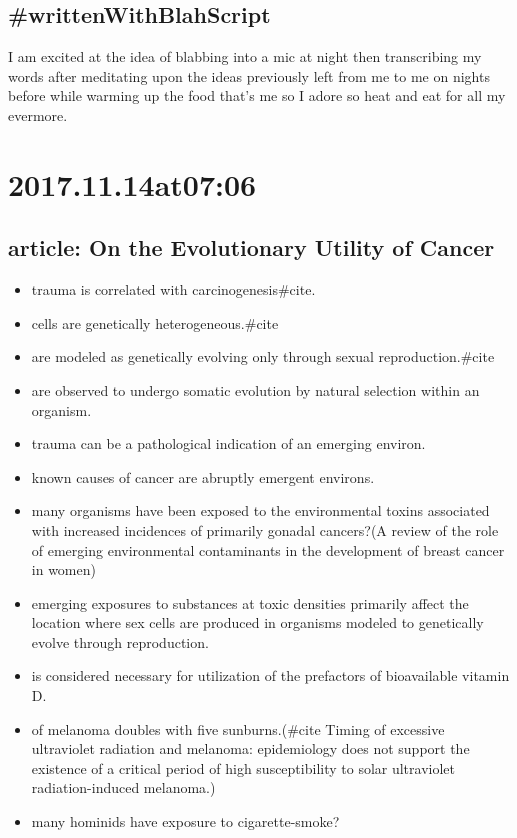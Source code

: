 \begin{enumerate}
\begin{enumerate}
\subsection*{ #writtenWithBlahScript }
I am excited at the idea of blabbing into a mic at night then transcribing my words after meditating upon the ideas previously left from me to me on nights before while warming up the food that's me so I adore so heat and eat for all my evermore.

\section*{ 2017.11.14at07:06 }
\subsection*{ article: On the Evolutionary Utility of Cancer }
\begin{itemize}
  \item trauma is correlated with carcinogenesis#cite.
  \item cells are genetically heterogeneous.#cite
  \item are modeled as genetically evolving only through sexual reproduction.#cite
  \item are observed to undergo somatic evolution by natural selection within an organism.
  \item trauma can be a pathological indication of an emerging environ.
  \item known causes of cancer are abruptly emergent environs.
  \item many organisms have been exposed to the environmental toxins associated with increased incidences of primarily gonadal cancers?(A review of the role of emerging environmental contaminants in the development of breast cancer in women)
  \item emerging exposures to substances at toxic densities primarily affect the location where sex cells are produced in organisms modeled to genetically evolve through reproduction.
  \item is considered necessary for utilization of the prefactors of bioavailable vitamin D.
  \item of melanoma doubles with five sunburns.(#cite Timing of excessive ultraviolet radiation and melanoma: epidemiology does not support the existence of a critical period of high susceptibility to solar ultraviolet radiation-induced melanoma.)
  \item many hominids have exposure to cigarette-smoke?

\end{itemize}
\end{enumerate}
\end{enumerate}
